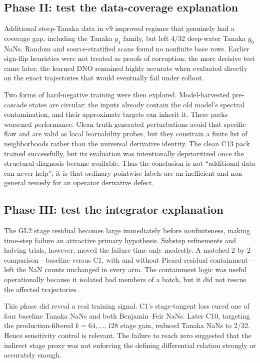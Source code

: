 \documentclass[11pt]{article}
\begin{document}
\subsection{Phase II: test the data-coverage explanation}

Additional steep-Tanaka data in v9 improved regimes that genuinely had a
coverage gap, including the Tanaka \(g_1\) family, but left 4/32 deep-water
Tanaka \(g_0\) NaNs.  Random and source-stratified scans found no nonfinite base
rows.  Earlier sign-flip heuristics were not treated as proofs of corruption;
the more decisive test came later: the learned DNO remained highly accurate
when evaluated directly on the exact trajectories that would eventually fail
under rollout.

Two forms of hard-negative training were then explored.  Model-harvested
pre-cascade states are circular: the inputs already contain the old model's
spectral contamination, and their approximate targets can inherit it.  These
packs worsened performance.  Clean truth-generated perturbations avoid that
specific flaw and are valid as local learnability probes, but they constrain a
finite list of neighborhoods rather than the universal derivative identity.
The clean C13 pack trained successfully, but its evaluation was intentionally
deprioritized once the structural diagnosis became available.  Thus the
conclusion is not ``additional data can never help''; it is that ordinary
pointwise labels are an inefficient and non-general remedy for an operator
derivative defect.

\subsection{Phase III: test the integrator explanation}

The GL2 stage residual becomes large immediately before nonfiniteness, making
time-step failure an attractive primary hypothesis.  Substep refinements and
halving trials, however, moved the failure time only modestly.  A matched
2-by-2 comparison---baseline versus C1, with and without Picard-residual
containment---left the NaN counts unchanged in every arm.  The containment
logic was useful operationally because it isolated bad members of a batch, but
it did not rescue the affected trajectories.

This phase did reveal a real training signal.  C1's stage-tangent loss cured
one of four baseline Tanaka NaNs and both Benjamin--Feir NaNs.  Later C10,
targeting the production-filtered \(k=64,\ldots,128\) stage gain, reduced
Tanaka NaNs to 2/32.  Hence sensitivity control is relevant.  The failure to
reach zero suggested that the indirect stage proxy was not enforcing the
defining differential relation strongly or accurately enough.
\end{document}
